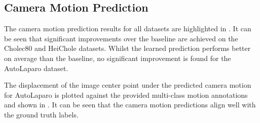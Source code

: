 \begin{table}[htb]
    \caption{Memory footprint and execution time of different camera motion estimators, refer to .}
    \label{c3:tab:estimation_speed}
    \centering
\end{table}

\subsection{Camera Motion Prediction}
The camera motion prediction results for all datasets are highlighted in . It can be seen that significant improvements over the baseline are achieved on the Cholec80 and HeiChole datasets. Whilst the learned prediction performs better on average than the baseline, no significant improvement is found for the AutoLaparo dataset.

The displacement of the image center point under the predicted camera motion for AutoLaparo is plotted against the provided multi-class motion annotations and shown in . It can be seen that the camera motion predictions align well with the ground truth labels.

